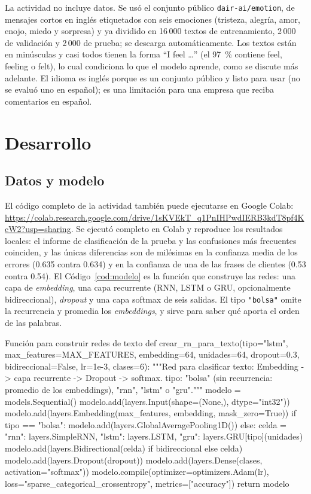 \documentclass[11pt,letterpaper]{article}
\begin{document}
La actividad no incluye datos. Se usó el conjunto público \texttt{dair-ai/emotion}, de mensajes cortos en inglés etiquetados con seis emociones (tristeza, alegría, amor, enojo, miedo y sorpresa) y ya dividido en 16\,000 textos de entrenamiento, 2\,000 de validación y 2\,000 de prueba; se descarga automáticamente. Los textos están en minúsculas y casi todos tienen la forma ``I feel \ldots'' (el 97~\% contiene feel, feeling o felt), lo cual condiciona lo que el modelo aprende, como se discute más adelante. El idioma es inglés porque es un conjunto público y listo para usar (no se evaluó uno en español); es una limitación para una empresa que reciba comentarios en español.

\section{Desarrollo}

\subsection{Datos y modelo}

El código completo de la actividad también puede ejecutarse en Google Colab: \url{https://colab.research.google.com/drive/1sKVEkT_q1PnIHPwdIERB3kdT8pf4KcW2?usp=sharing}. Se ejecutó completo en Colab y reproduce los resultados locales: el informe de clasificación de la prueba y las confusiones más frecuentes coinciden, y las únicas diferencias son de milésimas en la confianza media de los errores (0.635 contra 0.634) y en la confianza de una de las frases de clientes (0.53 contra 0.54). El Código~\ref{cod:modelo} es la función que construye las redes: una capa de \textit{embedding}, una capa recurrente (RNN, LSTM o GRU, opcionalmente bidireccional), \textit{dropout} y una capa softmax de seis salidas. El tipo \texttt{"bolsa"} omite la recurrencia y promedia los \textit{embeddings}, y sirve para saber qué aporta el orden de las palabras.

\begin{codigo}[label=cod:modelo]{Función para construir redes de texto}
def crear_rn_para_texto(tipo="lstm", max_features=MAX_FEATURES, embedding=64, unidades=64, dropout=0.3,
                        bidireccional=False, lr=1e-3, clases=6):
    """Red para clasificar texto: Embedding -> capa recurrente -> Dropout -> softmax.
    tipo: "bolsa" (sin recurrencia: promedio de los embeddings), "rnn", "lstm" o "gru"."""
    modelo = models.Sequential()
    modelo.add(layers.Input(shape=(None,), dtype="int32"))
    modelo.add(layers.Embedding(max_features, embedding, mask_zero=True))
    if tipo == "bolsa":
        modelo.add(layers.GlobalAveragePooling1D())
    else:
        celda = {"rnn": layers.SimpleRNN, "lstm": layers.LSTM, "gru": layers.GRU}[tipo](unidades)
        modelo.add(layers.Bidirectional(celda) if bidireccional else celda)
    modelo.add(layers.Dropout(dropout))
    modelo.add(layers.Dense(clases, activation="softmax"))
    modelo.compile(optimizer=optimizers.Adam(lr), loss="sparse_categorical_crossentropy", metrics=["accuracy"])
    return modelo
\end{codigo}
\end{document}
